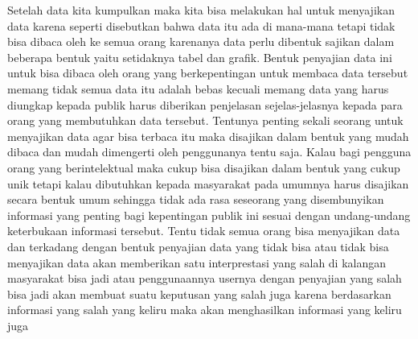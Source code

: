 \documentclass[
]{book}
\theoremstyle{definition}
\theoremstyle{definition}
\theoremstyle{definition}
\theoremstyle{definition}
\theoremstyle{remark}
\begin{document}
Setelah data kita kumpulkan maka kita bisa melakukan hal untuk menyajikan data karena seperti disebutkan bahwa data itu ada di mana-mana tetapi tidak bisa dibaca oleh ke semua orang karenanya data perlu dibentuk sajikan dalam beberapa bentuk yaitu setidaknya tabel dan grafik. Bentuk penyajian data ini untuk bisa dibaca oleh orang yang berkepentingan untuk membaca data tersebut memang tidak semua data itu adalah bebas kecuali memang data yang harus diungkap kepada publik harus diberikan penjelasan sejelas-jelasnya kepada para orang yang membutuhkan data tersebut.
Tentunya penting sekali seorang untuk menyajikan data agar bisa terbaca itu maka disajikan dalam bentuk yang mudah dibaca dan mudah dimengerti oleh penggunanya tentu saja. Kalau bagi pengguna orang yang berintelektual maka cukup bisa disajikan dalam bentuk yang cukup unik tetapi kalau dibutuhkan kepada masyarakat pada umumnya harus disajikan secara bentuk umum sehingga tidak ada rasa seseorang yang disembunyikan informasi yang penting bagi kepentingan publik ini sesuai dengan undang-undang keterbukaan informasi tersebut. Tentu tidak semua orang bisa menyajikan data dan terkadang dengan bentuk penyajian data yang tidak bisa atau tidak bisa menyajikan data akan memberikan satu interprestasi yang salah di kalangan masyarakat bisa jadi atau penggunaannya usernya dengan penyajian yang salah bisa jadi akan membuat suatu keputusan yang salah juga karena berdasarkan informasi yang salah yang keliru maka akan menghasilkan informasi yang keliru juga
\end{document}
